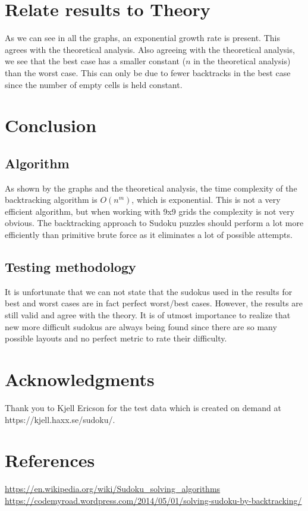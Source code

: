 \documentclass{article}
\begin{document}
\section{Relate results to Theory}
As we can see in all the graphs, an exponential growth rate is present. This agrees with the theoretical analysis. Also agreeing with the theoretical analysis, we see that the best case has a smaller constant ($n$ in the theoretical analysis) than the worst case. This can only be due to fewer backtracks in the best case since the number of empty cells is held constant.

\section{Conclusion}
\subsection{Algorithm}
As shown by the graphs and the theoretical analysis, the time complexity of the backtracking algorithm is $O(n^m)$, which is exponential. This is not a very efficient algorithm, but when working with 9x9 grids the complexity is not very obvious. The backtracking approach to Sudoku puzzles should perform a lot more efficiently than primitive brute force as it eliminates a lot of possible attempts.

\subsection{Testing methodology}
It is unfortunate that we can not state that the sudokus used in the results for best and worst cases are in fact perfect worst/best cases. However, the results are still valid and agree with the theory. It is of utmost importance to realize that new more difficult sudokus are always being found since there are so many possible layouts and no perfect metric to rate their difficulty.

\section{Acknowledgments}
Thank you to Kjell Ericson for the test data which is created on demand at https://kjell.haxx.se/sudoku/.

\section{References}
\url{https://en.wikipedia.org/wiki/Sudoku_solving_algorithms} \\
\url{https://codemyroad.wordpress.com/2014/05/01/solving-sudoku-by-backtracking/}
\end{document}
